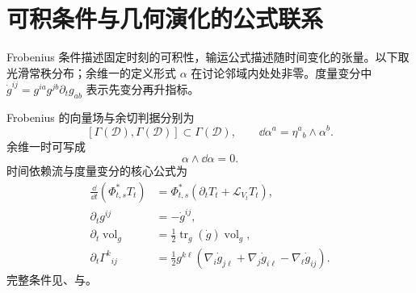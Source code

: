 \section{可积条件与几何演化的公式联系}
Frobenius 条件描述固定时刻的可积性，输运公式描述随时间变化的张量。以下取光滑常秩分布；余维一的定义形式 $\alpha$ 在讨论邻域内处处非零。度量变分中 $\dot g^{ij}=g^{ia}g^{jb}\partial_tg_{ab}$ 表示先变分再升指标。
\begin{note}[公式之间的联系]
Frobenius 的向量场与余切判据分别为
\[
[\Gamma(\mathcal D),\Gamma(\mathcal D)]\subset\Gamma(\mathcal D),
\qquad
\dd\alpha^a=\eta^a{}_b\wedge\alpha^b.
\]
余维一时可写成
\[
\alpha\wedge\dd\alpha=0.
\]
时间依赖流与度量变分的核心公式为
\begin{align*}
\frac{\dd}{\dd t}(\Phi_{t,s}^*T_t)
&=\Phi_{t,s}^*(\partial_tT_t+\mathcal L_{V_t}T_t),\\
\partial_tg^{ij}&=-\dot g^{ij},\\
\partial_t\operatorname{vol}_g&=\frac12\operatorname{tr}_g(\dot g)\operatorname{vol}_g,\\
\partial_t\Gamma^k{}_{ij}
&=\frac12g^{k\ell}(\nabla_i \dot g_{j\ell}+\nabla_j \dot g_{i\ell}-\nabla_\ell \dot g_{ij}).
\end{align*}
完整条件见、与。
\end{note}


